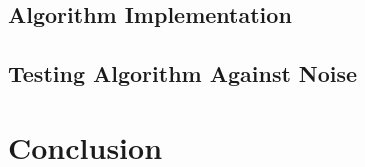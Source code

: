 \documentclass[12pt]{article}
\begin{document}
    \subsection{Algorithm Implementation}
    \subsection{Testing Algorithm Against Noise}
    \section{Conclusion}
  \newpage    
    \printbibliography
\end{document}
